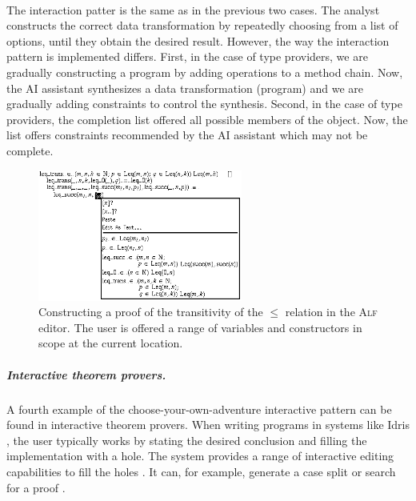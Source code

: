 \documentclass[a4paper,UKenglish,cleveref, autoref, thm-restate]{lipics-v2021}
\begin{document}
~

The interaction patter is the same as in the previous two cases. The analyst constructs the
correct data transformation by repeatedly choosing from a list of options, until they obtain
the desired result. However, the way the interaction pattern is implemented differs.
First, in the case of type providers, we are gradually constructing a program by adding operations to
a method chain. Now, the AI assistant synthesizes a data transformation (program) and we are
gradually adding constraints to control the synthesis. Second, in the case of type providers,
the completion list offered all possible members of the object. Now, the list offers
constraints recommended by the AI assistant which may not be complete.

\newpage

\begin{figure}[t]
  \includegraphics[width=0.6\textwidth]{fig/alf.png}
  \caption{Constructing a proof of the transitivity of the $\leq$ relation in the \textsc{Alf}
    editor. The user is offered a range of variables and constructors in scope at the current
    location. \cite{altenkirch-1994-alf}}
  \label{fig:alf}
\end{figure}

\subparagraph{Interactive theorem provers.}
A fourth example of the choose-your-own-adventure interactive pattern can be found in interactive
theorem provers. When writing programs in systems like Idris \cite{brady-2021-idris2}, the
user typically works by stating the desired conclusion and filling the implementation with a hole.
The system provides a range of interactive editing capabilities to fill the holes \cite{mcbride-1999-dependently}.
It can, for example, generate a case split or search for a proof \cite{brady-2015-idris}.
\end{document}
